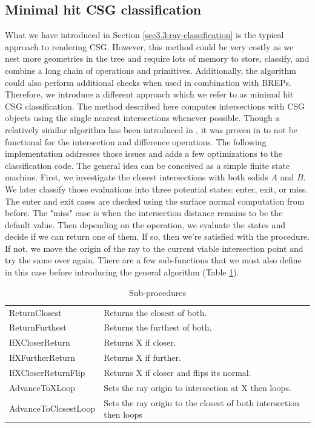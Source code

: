 \documentclass[a4paper,11pt,oneside]{article}
\begin{document}
\subsection{Minimal hit CSG classification}
\label{section:classification-optimization}


What we have introduced in Section \ref{sec3.3:ray-classification} is the typical approach to rendering CSG. However, this method could be very costly as we nest more geometries in the tree and require lots of memory to store, classify, and combine a long chain of operations and primitives. Additionally, the algorithm could also perform additional checks when used in combination with BREPs. Therefore, we introduce a different approach which we refer to as minimal hit CSG classification. The method described here computes intersections with CSG objects using the single nearest intersections whenever possible. Though a relatively similar algorithm has been introduced in \cite{kensler_ray_2006}, it was proven in \cite{csg-xrt-renderer} to not be functional for the intersection and difference operations. The following implementation addresses those issues and adds a few optimizations to the classification code. The general idea can be conceived as a simple finite state machine. First, we investigate the closest intersections with both solids $A$ and $B$. We later classify those evaluations into three potential states: enter, exit, or miss. The enter and exit cases are checked using the surface normal computation from before. The "miss" case is when the intersection distance remains to be the default value. Then depending on the operation, we evaluate the states and decide if we can return one of them. If so, then we're satisfied with the procedure. If not, we move the origin of the ray to the current viable intersection point and try the same over again. 
There are a few sub-functions that we must also define in this case before introducing the general algorithm (Table \ref{table:procedure-details}).

\begin{table}[H]
	\caption{Sub-procedures}
	\label{table:procedure-details}
	\begin{tabularx}{\textwidth}{p{}X}
		\toprule
		ReturnClosest        & Returns the closest of both.                                       \\
		ReturnFurthest       & Returns the furthest of both.                                      \\
		IfXCloserReturn      & Returns X if closer.                                               \\
		IfXFurtherReturn     & Returns X if further.                                              \\
		IfXCloserReturnFlip  & Returns X if closer and flips its normal.                          \\
		AdvanceToXLoop       & Sets the ray origin to intersection at X then loops.               \\
		AdvanceToClosestLoop & Sets the ray origin to the closest of both intersection then loops \\
		\bottomrule
	\end{tabularx}
\end{table}
\end{document}
